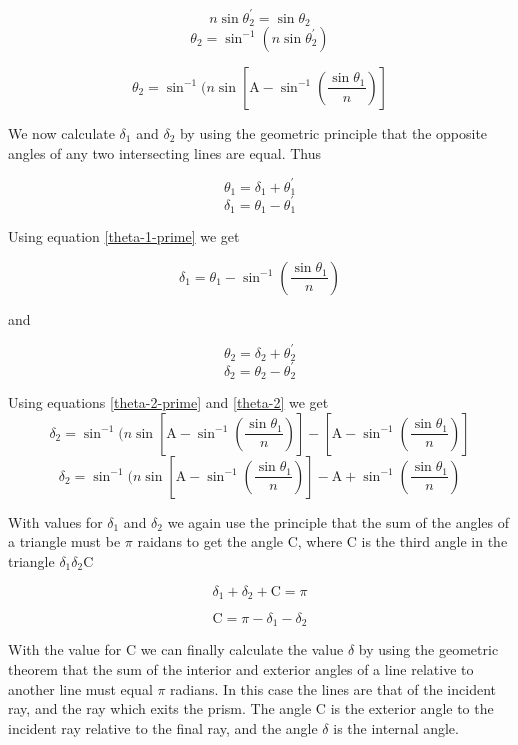 $$
	n\sin\theta^{'}_2 = \sin\theta_2
$$ 
$$
	\theta_2 = \sin^{-1}\left(n\sin\theta^{'}_2\right)
$$

\begin{equation} \label{theta-2}
	\theta_2 = \sin^{-1}(n\sin\left[ \mathrm{A} - \sin^{-1}\left(\frac{\sin\theta_1}{n}\right) \right]
\end{equation}

We now calculate $\delta_1$ and $\delta_2$ by using the geometric principle that the opposite angles of any two intersecting lines are 
equal. Thus 

$$
	\theta_1 = \delta_1 + \theta^{'}_1
$$
$$
	\delta_1 = \theta_1 - \theta^{'}_1
$$

Using equation \ref{theta-1-prime} we get

\begin{equation} \label{delta-1}
	\delta_1 = \theta_1 - \sin^{-1}\left(\frac{\sin\theta_1}{n}\right)
\end{equation}

and

$$
	\theta_2 = \delta_2 + \theta^{'}_2
$$
$$
	\delta_2 = \theta_2 - \theta^{'}_2
$$

Using equations \ref{theta-2-prime} and \ref{theta-2} we get
$$
	\delta_2 = \sin^{-1}(n\sin\left[ \mathrm{A} - \sin^{-1}\left(\frac{\sin\theta_1}{n}\right) \right]
  	- \left[\mathrm{A} - \sin^{-1}\left(\frac{\sin\theta_1}{n}\right)\right]
$$
\begin{equation} \label{delta-2}
	\delta_2 = \sin^{-1}(n\sin\left[ \mathrm{A} - \sin^{-1}\left(\frac{\sin\theta_1}{n}\right) \right]
  	- \mathrm{A} + \sin^{-1}\left(\frac{\sin\theta_1}{n}\right)
\end{equation}

With values for $\delta_1$ and $\delta_2$ we again use the principle that the sum of the angles of a triangle must be $\pi$ raidans to 
get the angle C, where C is the third angle in the triangle $\delta_1\delta_2\mathrm{C}$

$$\delta_1 + \delta_2 + \mathrm{C} = \pi$$

\begin{equation} \label{C}
	\mathrm{C} = \pi - \delta_1 - \delta_2
\end{equation}

With the value for C we can finally calculate the value $\delta$ by using the geometric theorem that the sum of the interior and exterior
angles of a line relative to another line must equal $\pi$ radians. In this case the lines are that of the incident ray, and the ray which
exits the prism. The angle C is the exterior angle to the incident ray relative to the final ray, and the angle $\delta$ is the internal
angle.

